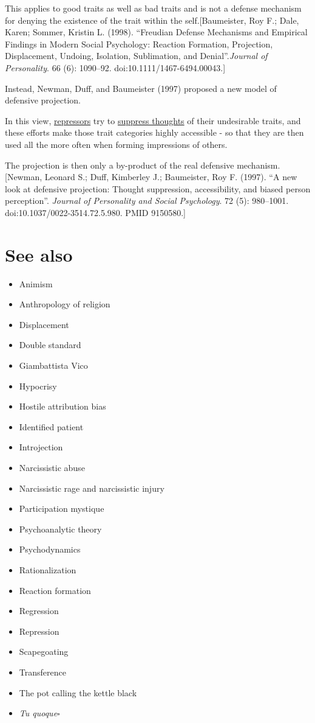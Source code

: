 \documentclass{book}
\numberwithin{equation}{section}
\begin{document}
This applies to good traits as well as bad traits and is not a defense mechanism for denying the existence of the trait within the self.[Baumeister, Roy F.; Dale, Karen; Sommer, Kristin L. (1998). ``Freudian Defense Mechanisms and Empirical Findings in Modern Social Psychology: Reaction Formation, Projection, Displacement, Undoing, Isolation, Sublimation, and Denial''.\textit{Journal of Personality}. 66 (6): 1090--92. doi:10.1111/1467-6494.00043.]

%
Instead, Newman, Duff, and Baumeister (1997) proposed a new model of defensive projection.

In this view, \href{https://en.wikipedia.org/wiki/Psychological_repression}{repressors} try to \href{https://en.wikipedia.org/wiki/Thought_suppression}{suppress thoughts} of their undesirable traits, and these efforts make those trait categories highly accessible - so that they are then used all the more often when forming impressions of others.

The projection is then only a by-product of the real defensive mechanism.[Newman, Leonard S.; Duff, Kimberley J.; Baumeister, Roy F. (1997). ``A new look at defensive projection: Thought suppression, accessibility, and biased person perception''. \textit{Journal of Personality and Social Psychology}. 72 (5): 980–1001. doi:10.1037/0022-3514.72.5.980. PMID 9150580.]

\section{See also}
\begin{itemize}
    \item Animism
    \item Anthropology of religion
    \item Displacement
    \item Double standard
    \item Giambattista Vico
    \item Hypocrisy
    \item Hostile attribution bias
    \item Identified patient
    \item Introjection
    \item Narcissistic abuse
    \item Narcissistic rage and narcissistic injury
    \item Participation mystique
    \item Psychoanalytic theory
    \item Psychodynamics
    \item Rationalization
    \item Reaction formation
    \item Regression
    \item Repression
    \item Scapegoating
    \item Transference
    \item The pot calling the kettle black
    \item \textit{Tu quoque}\hfill$\square$
\end{itemize}





\printbibliography[heading=bibintoc]
\end{document}
